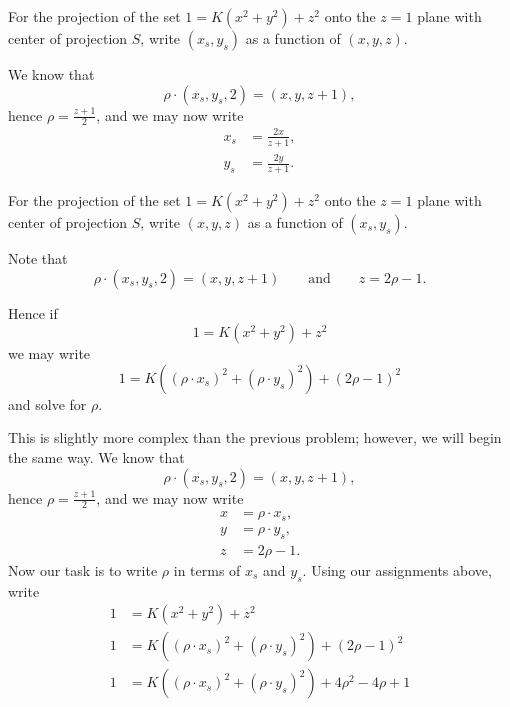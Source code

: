 \documentclass{ximera}
\begin{document}
\begin{problem}
  For the projection of the set $1=K\left(x^{2}+y^{2}\right)+z^{2}$
  onto the $z=1$ plane with center of projection $S$, write
  $(x_{s},y_{s})$ as a function of $(x,y,z)$.
  \begin{freeResponse}
    We know that
    \[
    \rho\cdot(x_{s},y_{s},2)=(x,y,z+1),
    \]
    hence $\rho=\frac{z+1}{2}$, and we may now write
    \begin{align*}
      x_{s} &=\frac{2x}{z+1},\\
      y_{s} &=\frac{2y}{z+1}.
    \end{align*}
  \end{freeResponse}
\end{problem}

\begin{problem}
  For the projection of the set $1=K\left(x^{2}+y^{2}\right)+z^{2}$
  onto the $z=1$ plane with center of projection $S$, write
  $(x,y,z)$ as a function of $(x_s,y_s)$.
  \begin{hint}
    Note that
      \[
      \rho\cdot(x_{s},y_{s},2)=(x,y,z+1) \qquad\text{and}\qquad z = 2\rho-1.
      \]
  \end{hint}
  \begin{hint}
    Hence if
    \[
    1 = K\left(x^2 + y^2\right) + z^2
    \]
    we may write
    \[
    1 = K\left((\rho\cdot x_s)^2 + (\rho\cdot y_s)^2\right) + (2\rho-1)^2
    \]
    and solve for $\rho$.
  \end{hint}
  \begin{freeResponse}
    This is slightly more complex than the previous problem; however,
    we will begin the same way. We know that
    \[
    \rho\cdot(x_{s},y_{s},2)=(x,y,z+1),
    \]
    hence $\rho=\frac{z+1}{2}$, and we may now write
    \begin{align*}
      x &= \rho \cdot x_s,\\
      y &= \rho \cdot y_s,\\
      z &= 2\rho-1.
    \end{align*}
    Now our task is to write $\rho$ in terms of $x_s$ and
    $y_s$. Using our assignments above, write
    \begin{align*}
      1 &= K\left(x^2 + y^2\right) + z^2\\
      1 &= K\left((\rho\cdot x_s)^2 + (\rho\cdot y_s)^2\right) + (2\rho-1)^2\\
      1 &= K\left((\rho\cdot x_s)^2 + (\rho\cdot y_s)^2\right) + 4\rho^2-4\rho + 1\\
    \end{align*}

\end{freeResponse}
\end{problem}
\end{document}
